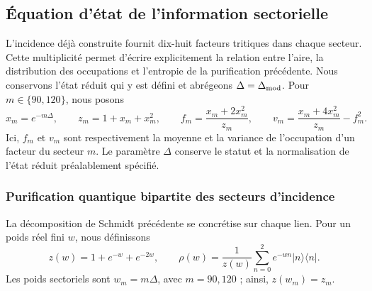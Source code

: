 \subsection{Équation d'état de l'information sectorielle}
\label{ii:sec:ii-ecuacion-informacion}

L'incidence déjà construite fournit dix-huit facteurs tritiques dans
chaque secteur. Cette multiplicité permet d'écrire explicitement la
relation entre l'aire, la distribution des occupations et l'entropie de
la purification précédente. Nous conservons l'état réduit qui y est défini
et abrégeons $\Delta=\Delta_{\rm mod}$. Pour $m\in\{90,120\}$, nous posons
\begin{equation}
 x_m=e^{-m\Delta},\qquad z_m=1+x_m+x_m^2,\qquad
 f_m=\frac{x_m+2x_m^2}{z_m},\qquad
 v_m=\frac{x_m+4x_m^2}{z_m}-f_m^2.
 \label{ii:eq:ii-sector-momentos}
\end{equation}
Ici, $f_m$ et $v_m$ sont respectivement la moyenne et la variance de
l'occupation d'un facteur du secteur $m$. Le paramètre $\Delta$ conserve
le statut et la normalisation de l'état réduit préalablement
spécifié.

\subsubsection{Purification quantique bipartite des secteurs d’incidence}
\label{ii:sec:ii-area-purificacion-producto}

La décomposition de Schmidt précédente se concrétise sur chaque lien.
Pour un poids réel fini \(w\), nous définissons
\[
 z(w)=1+e^{-w}+e^{-2w},\qquad
 \rho(w)=\frac1{z(w)}\sum_{n=0}^2e^{-wn}|n\rangle\langle n|.
\]
Les poids sectoriels sont \(w_m=m\Delta\), avec \(m=90,120\) ;
ainsi, \(z(w_m)=z_m\).


